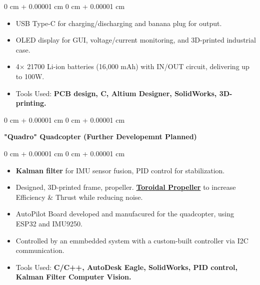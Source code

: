 \documentclass[10pt, letterpaper]{article}
\newenvironment{highlights}{
    \begin{itemize}[
        topsep=0.10 cm,
        parsep=0.10 cm,
        partopsep=0pt,
        itemsep=0pt,
        leftmargin=0 cm + 10pt
    ]
}{
    \end{itemize}
} %
\newenvironment{onecolentry}{
    \begin{adjustwidth}{
        0 cm + 0.00001 cm
    }{
        0 cm + 0.00001 cm
    }
}{
    \end{adjustwidth}
} %
\newenvironment{twocolentry}[2][]{
    \onecolentry
    \def\secondColumn{#2}
    \setcolumnwidth{\fill, 4.5 cm}
    \begin{paracol}{2}
}{
    \switchcolumn \raggedleft \secondColumn
    \end{paracol}
    \endonecolentry
} %
\begin{document}
\vspace{0.10 cm}
\begin{onecolentry}
\begin{highlights}
      \item USB Type-C for charging/discharging and banana plug for output.
      \item OLED display for GUI, voltage/current monitoring, and 3D-printed industrial case.
      \item 4× 21700 Li-ion batteries (16,000 mAh) with IN/OUT circuit, delivering up to 100W.
      \item Tools Used:\textbf{ PCB design, C, Altium Designer, SolidWorks, 3D-printing.}
\end{highlights}
\end{onecolentry}

\vspace{0.4 cm}
\begin{twocolentry}{
            2002
      }
      \textbf{"Quadro" Quadcopter (Further Developemnt Planned)}\end{twocolentry}

\vspace{0.10 cm}
\begin{onecolentry}
      \begin{highlights}
            \item \textbf{Kalman filter} for IMU sensor fusion, PID control for stabilization.
            \item Designed, 3D-printed frame, propeller. \textbf{\href{https://www.ll.mit.edu/sites/default/files/other/doc/2022-09/TVO_Technology_Highlight_41_Toroidal_Propeller.pdf}{Toroidal Propeller}} to 
            increase Efficiency \& Thrust while reducing noise.
            \item AutoPilot Board developed and manufacured for the quadcopter, using ESP32 and IMU9250.
            \item Controlled by an emmbedded system with a custom-built controller via I2C communication.
            \item Tools Used: \textbf{C/C++, AutoDesk Eagle, SolidWorks, PID control, Kalman Filter Computer Vision.}
            
      \end{highlights}
\end{onecolentry}
\end{document}
